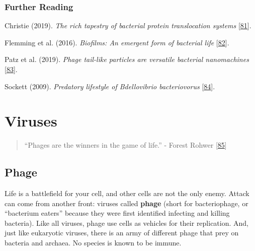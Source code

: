 \documentclass[]{tufte-book}
\begin{document}
\hypertarget{further-reading-8}{%
\subsection*{Further Reading}\label{further-reading-8}}

Christie (2019). \emph{The rich tapestry of bacterial protein translocation systems} {[}\protect\hyperlink{ref-christie2019}{81}{]}.

Flemming et al. (2016). \emph{Biofilms: An emergent form of bacterial life} {[}\protect\hyperlink{ref-flemming2016}{82}{]}.

Patz et al. (2019). \emph{Phage tail-like particles are versatile bacterial nanomachines} {[}\protect\hyperlink{ref-patz2019}{83}{]}.

Sockett (2009). \emph{Predatory lifestyle of Bdellovibrio bacteriovorus} {[}\protect\hyperlink{ref-sockett2009}{84}{]}.

\hypertarget{viruses}{%
\chapter{Viruses}\label{viruses}}

\begin{quote}
``Phages are the winners in the game of life.''
- Forest Rohwer {[}\protect\hyperlink{ref-rohwer2014}{85}{]}
\end{quote}

\hypertarget{phage}{%
\section{Phage}\label{phage}}

Life is a battlefield for your cell, and other cells are not the only enemy. Attack can come from another front: viruses called \textbf{phage} (short for bacteriophage, or ``bacterium eaters'' because they were first identified infecting and killing bacteria). Like all viruses, phage use cells as vehicles for their replication. And, just like eukaryotic viruses, there is an army of different phage that prey on bacteria and archaea. No species is known to be immune.
\end{document}
